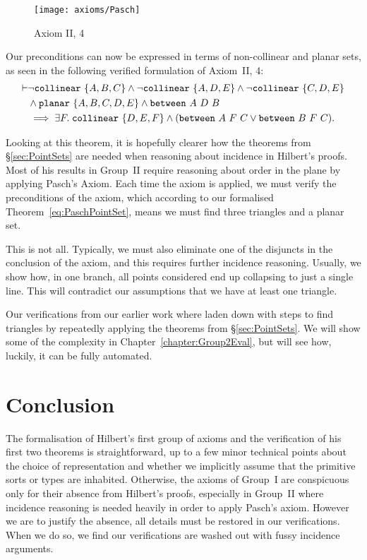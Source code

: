 \begin{figure}
\centering\texttt{[image: axioms/Pasch]}
\caption{Axiom II, 4}
\label{fig:PaschDiagram}
\end{figure}

Our preconditions can now be expressed in terms of non-collinear and planar sets, as seen in the following verified formulation of Axiom~II, 4:%
\begin{equation}\label{eq:PaschPointSet}
\begin{aligned}
  \vdash&\neg\code{collinear}\ \{A,B,C\}\wedge\neg\code{collinear}\ \{A,D,E\}\wedge\neg\code{collinear}\ \{C,D,E\}\\
  &\wedge\code{planar}\ \{A,B,C,D,E\}\wedge\between{A}{D}{B}\\
  &\implies\exists F.\; \code{collinear}\ \{D,E,F\} \wedge (\between{A}{F}{C}\vee\between{B}{F}{C}).
\end{aligned}
\end{equation}

Looking at this theorem, it is hopefully clearer how the theorems from \S\ref{sec:PointSets} are needed when reasoning about incidence in Hilbert's proofs. Most of his results in Group~II require reasoning about order in the plane by applying Pasch's Axiom. Each time the axiom is applied, we must verify the preconditions of the axiom, which according to our formalised Theorem~\ref{eq:PaschPointSet}, means we must find three triangles and a planar set.

This is not all. Typically, we must also eliminate one of the disjuncts in the conclusion of the axiom, and this requires further incidence reasoning. Usually, we show how, in one branch, all points considered end up collapsing to just a single line. This will contradict our assumptions that we have at least one triangle.

Our verifications from our earlier work where laden down with steps to find triangles by repeatedly applying the theorems from \S\ref{sec:PointSets}. We will show some of the complexity in Chapter~\ref{chapter:Group2Eval}, but will see how, luckily, it can be fully automated.

\section{Conclusion}
The formalisation of Hilbert's first group of axioms and the verification of his first two theorems is straightforward, up to a few minor technical points about the choice of representation and whether we implicitly assume that the primitive sorts or types are inhabited. Otherwise, the axioms of Group~I are conspicuous only for their absence from Hilbert's proofs, especially in Group~II where incidence reasoning is needed heavily in order to apply Pasch's axiom. However we are to justify the absence, all details must be restored in our verifications. When we do so, we find our verifications are washed out with fussy incidence arguments.


